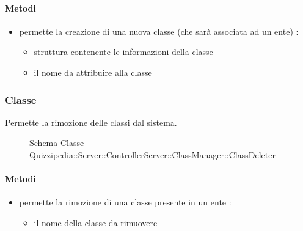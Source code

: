 \paragraph{Metodi}
\begin{itemize}
\item {}
\newline
permette la creazione di una nuova classe (che sarà associata ad un ente)
\newline
{} :
\begin{itemize}
\item {}
\newline
struttura contenente le informazioni della classe
\item {}
\newline
il nome da attribuire alla classe
\end{itemize}
\end{itemize}
\subsubsection{Classe }
Permette la rimozione delle classi dal sistema.
\begin{figure}[H]
\centering
\noindent{}
\caption[Schema Classe ClassDeleter]{Schema Classe Quizzipedia::Server::ControllerServer::ClassManager::ClassDeleter}
\end{figure}
\paragraph{Metodi}
\begin{itemize}
\item {}
\newline
permette la rimozione di una classe presente in un ente
\newline
{} :
\begin{itemize}
\item {}
\newline
il nome della classe da rimuovere
\end{itemize}
\end{itemize}
